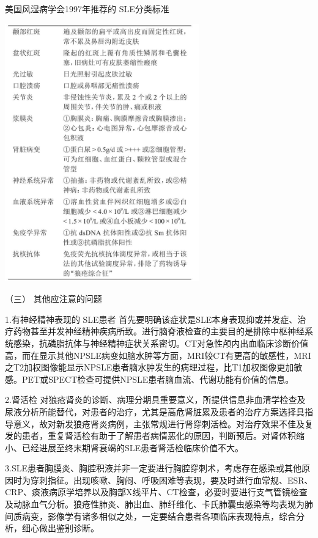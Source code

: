 \begin{table}[htbp]
\centering
\caption{美国风湿病学会1997年推荐的 SLE分类标准}
\label{tab125-1}
\includegraphics[width=3.30208in,height=4.39583in]{./images/Image00498.jpg}
\end{table}

\hypertarget{text00347.htmlux5cux23CHP14-1-2-3-3}{}
（三） 其他应注意的问题

1.有神经精神表现的 SLE患者
首先要明确该症状是SLE本身表现抑或并发症、治疗药物甚至并发神经精神疾病所致。进行脑脊液检查的主要目的是排除中枢神经系统感染，抗磷脂抗体与神经精神症状关系密切。CT对急性颅内出血临床诊断价值高，而在显示其他NPSLE病变如脑水肿等方面，MRI较CT有更高的敏感性，MRI之T2加权图像能显示NPSLE患者脑水肿发生的病理过程，比T1加权图像更加敏感。PET或SPECT检查可提供NPSLE患者脑血流、代谢功能有价值的信息。

2.肾活检
对狼疮肾炎的诊断、病理分期具重要意义，所提供信息非血清学检查及尿液分析所能替代，对患者的治疗，尤其是高危肾脏累及患者的治疗方案选择具指导意义，故对新发狼疮肾炎病例，主张常规进行肾穿刺活检。对治疗效果不佳及复发的患者，重复肾活检有助于了解患者病情恶化的原因，判断预后。对肾体积缩小、已经进展至终末期肾衰竭的SLE患者肾活检临床价值不大。

3.SLE患者胸膜炎、胸腔积液并非一定要进行胸腔穿刺术，考虑存在感染或其他原因时为穿刺指征。出现咳嗽、胸闷、呼吸困难等表现，要及时进行血常规、ESR、CRP、痰液病原学培养以及胸部X线平片、CT检查，必要时要进行支气管镜检查及动脉血气分析。狼疮性肺炎、肺出血、肺纤维化、卡氏肺囊虫感染等均表现为肺间质病变，影像学有诸多相似之处，一定要结合患者各项临床表现特点，综合分析，细心做出鉴别诊断。


